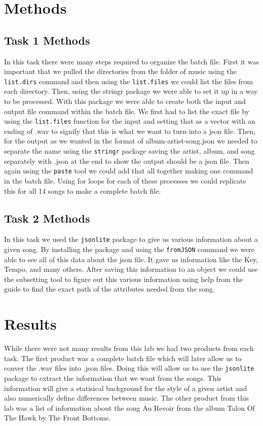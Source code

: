 \documentclass{article}\usepackage[]{graphicx}\usepackage[]{xcolor}
\begin{document}
\begin{multicols}{2}
\section{Methods}


\subsection{Task 1 Methods}

In this task there were many steps required to organize the batch file. First it was important that we pulled the directories from the folder of music using the \texttt{list.dirs} command and then using the \texttt{list.files} we could list the files from each directory. Then, using the stringr package we were able to set it up in a way to be processed. \citep{stringr} With this package we were able to create both the input and output file command within the batch file. We first had to list the exact file by using the \texttt{list.files} function for the input and setting that as a vector with an ending of .wav to signify that this is what we want to turn into a json file. Then, for the output as we wanted in the format of album-artist-song.json we needed to separate the name using the \texttt{stringr} package saving the artist, album, and song separately with .json at the end to show the output should be a json file. Then again using the \texttt{paste} tool we could add that all together making one command in the batch file. Using for loops for each of these processes we could replicate this for all 14 songs to make a complete batch file. 
\subsection{Task 2 Methods}

In this task we used the \texttt{jsonlite} package to give us various information about a given song. By installing the package and using the \texttt{fromJSON} command we were able to see all of this data about the json file. It gave us information like the Key, Tempo, and many others. After saving this information to an object we could use the subsetting tool to figure out this various information using help from the guide to find the exact path of the attributes needed from the song. 

\section{Results}
While there were not many results from this lab we had two products from each task. The first product was a complete batch file which will later allow us to conver the .wav files into .json files. Doing this will allow us to use the \texttt{jsonlite} package to extract the information that we want from the songs. This information will give a statisical background for the style of a given artist and also numerically define differences between music. The other product from this lab was a list of information about the song Au Revoir from the album Talon Of The Hawk by The Front Bottoms. 



\end{multicols}
\end{document}
